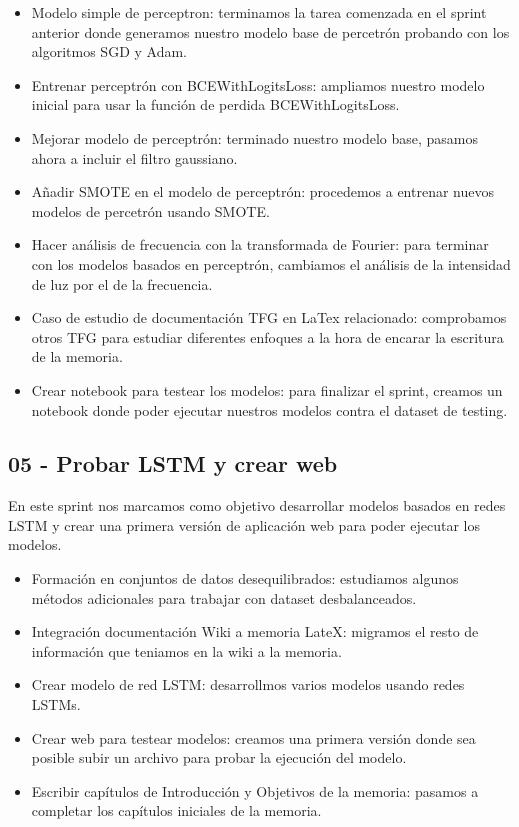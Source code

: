 \begin{itemize}
    \item Modelo simple de perceptron: terminamos la tarea comenzada en el sprint anterior donde generamos nuestro modelo base de percetrón probando con los algoritmos SGD y Adam.
    \item Entrenar perceptrón con BCEWithLogitsLoss: ampliamos nuestro modelo inicial para usar la función de perdida BCEWithLogitsLoss.
    \item Mejorar modelo de perceptrón: terminado nuestro modelo base, pasamos ahora a incluir el filtro gaussiano.
    \item Añadir SMOTE en el modelo de perceptrón: procedemos a entrenar nuevos modelos de percetrón usando SMOTE.
    \item Hacer análisis de frecuencia con la transformada de Fourier: para terminar con los modelos basados en perceptrón, cambiamos el análisis de la intensidad de luz por el de la frecuencia.
    \item Caso de estudio de documentación TFG en LaTex relacionado: comprobamos otros TFG para estudiar diferentes enfoques a la hora de encarar la escritura de la memoria.    
    \item Crear notebook para testear los modelos: para finalizar el sprint, creamos un notebook donde poder ejecutar nuestros modelos contra el dataset de testing.    
\end{itemize}    


\subsection{05 - Probar LSTM y crear web \newline
[21/04/2020 - 04/05/2020]}

En este sprint nos marcamos como objetivo desarrollar modelos basados en redes LSTM y crear una primera versión de aplicación web para poder ejecutar los modelos.

\begin{itemize}
    \item Formación en conjuntos de datos desequilibrados: estudiamos algunos métodos adicionales para trabajar con dataset desbalanceados.
    \item Integración documentación Wiki a memoria LateX: migramos el resto de información que teniamos en la wiki a la memoria. 
    \item Crear modelo de red LSTM: desarrollmos varios modelos usando redes LSTMs.
    \item Crear web para testear modelos: creamos una primera versión donde sea posible subir un archivo para probar la ejecución del modelo.    
    \item Escribir capítulos de Introducción y Objetivos de la memoria: pasamos a completar los capítulos iniciales de la memoria.
\end{itemize}


